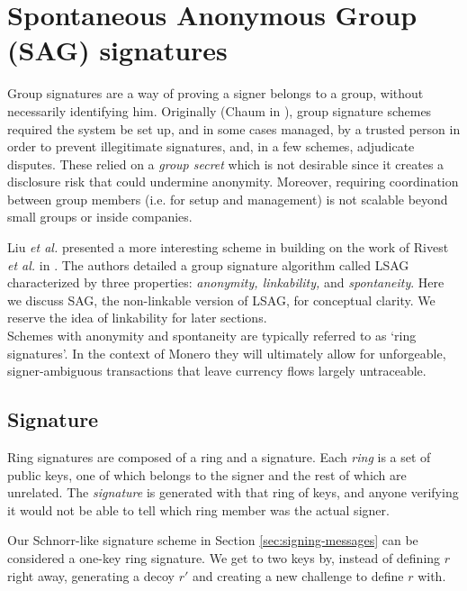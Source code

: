 \section{Spontaneous Anonymous Group (SAG) signatures}
\label{SAG_section}

Group signatures are a way of proving a signer belongs to a group, without necessarily identifying him. Originally (Chaum in \cite{Chaum:1991:GS:1754868.1754897}), group signature schemes required the system be set up, and in some cases managed, by a trusted person in order to prevent illegitimate signatures, and, in a few schemes, adjudicate disputes. These relied on a {\em group secret} which is not desirable since it creates a disclosure risk that could undermine anonymity. Moreover, requiring coordination between group members (i.e. for setup and management) is not scalable beyond small groups or inside companies.

Liu {\em et al.} presented a more interesting scheme in \cite{Liu2004} building on the work of Rivest {\em et al.} in \cite{rivest-leak-secret}. The authors detailed a group signature algorithm called LSAG characterized by three properties: {\em anonymity, linkability,} and {\em spontaneity}. Here we discuss SAG, the non-linkable version of LSAG, for conceptual clarity. We reserve the idea of linkability for later sections.
\\

Schemes with anonymity and spontaneity are typically referred to as `ring signatures'. In the context of Monero they will ultimately allow for unforgeable, signer-ambiguous transactions that leave currency flows largely untraceable.


\subsection*{Signature}

Ring signatures are composed of a ring and a signature. Each {\em ring} is a set of public keys, one of which belongs to the signer and the rest of which are unrelated. The {\em signature} is generated with that ring of keys, and anyone verifying it would not be able to tell which ring member was the actual signer.

Our Schnorr-like signature scheme in Section \ref{sec:signing-messages} can be considered a one-key ring signature. We get to two keys by, instead of defining $r$ right away, generating a decoy $r'$ and creating a new challenge to define $r$ with.
\\

